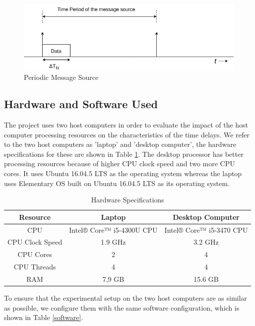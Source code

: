 \begin{figure}[h!]
\centering
\includegraphics[width=\textwidth]{Figure/Message_Source.png}
\caption{Periodic Message Source}
\label{message_source}
\end{figure}

\subsection{Hardware and Software Used}
The project uses two host computers in order to evaluate the impact of the host computer processing resources on the characteristics of the time delays.
We refer to the two host computers as 'laptop' and 'desktop computer', the hardware specifications for these are shown in Table \ref{hardware}.
The desktop processor has better processing resources because of higher CPU clock speed and two more CPU cores.
It uses Ubuntu 16.04.5 LTS as the operating system whereas the laptop uses Elementary OS built on Ubuntu 16.04.5 LTS as its operating system.\\
\begin{table}[h!]
    \centering
    \begin{tabular}{|c|c|c|}
    \hline
        Resource & Laptop & Desktop Computer\\
        \hline
         CPU & Intel® Core™ i5-4300U CPU &  Intel® Core™ i5-3470 CPU \\
         CPU Clock Speed & 1.9 GHz & 3.2 GHz \\
         CPU Cores & 2 & 4\\
         CPU Threads & 4 & 4\\
         RAM & 7,9 GB & 15.6 GB \\
         \hline
    \end{tabular}
    \caption{Hardware Specifications}
    \label{hardware}
\end{table}

To ensure that the experimental setup on the two host computers are as similar as possible, we configure them with the same software configuration, which is shown in Table \ref{software}.

